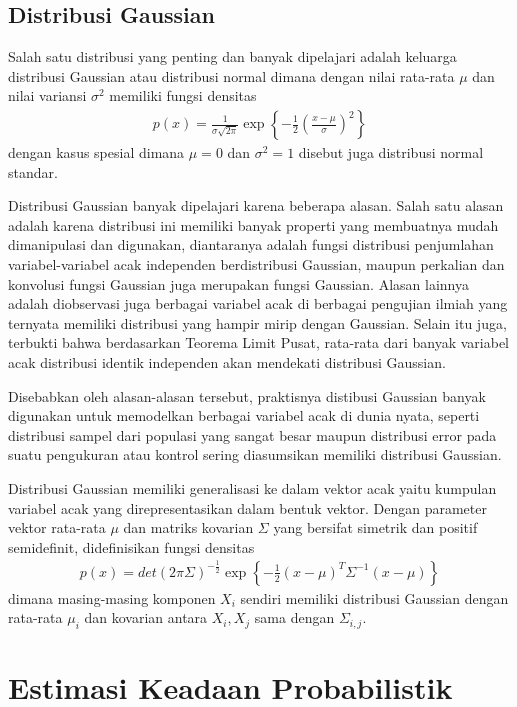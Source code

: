 \subsection{Distribusi Gaussian}

Salah satu distribusi yang penting dan banyak dipelajari adalah keluarga distribusi Gaussian atau distribusi normal dimana dengan nilai rata-rata $\mu$ dan nilai variansi $\sigma^2$ memiliki fungsi densitas
\begin{align}
    p(x) = \frac{1}{\sigma \sqrt{2\pi}} \exp\left\{-\frac{1}{2}\left(\frac{x-\mu}{\sigma}\right)^2\right\}
\end{align}
dengan kasus spesial dimana $\mu = 0$ dan $\sigma^2 = 1$ disebut juga distribusi normal standar.

Distribusi Gaussian banyak dipelajari karena beberapa alasan. Salah satu alasan adalah karena distribusi ini memiliki banyak properti yang membuatnya mudah dimanipulasi dan digunakan, diantaranya adalah fungsi distribusi penjumlahan variabel-variabel acak independen berdistribusi Gaussian, maupun perkalian dan konvolusi fungsi Gaussian juga merupakan fungsi Gaussian. Alasan lainnya adalah diobservasi juga berbagai variabel acak di berbagai pengujian ilmiah yang ternyata memiliki distribusi yang hampir mirip dengan Gaussian. Selain itu juga, terbukti bahwa berdasarkan Teorema Limit Pusat, rata-rata dari banyak variabel acak distribusi identik independen akan mendekati distribusi Gaussian. \citep{degroot2012}

Disebabkan oleh alasan-alasan tersebut, praktisnya distibusi Gaussian banyak digunakan untuk memodelkan berbagai variabel acak di dunia nyata, seperti distribusi sampel dari populasi yang sangat besar maupun distribusi error pada suatu pengukuran atau kontrol sering diasumsikan memiliki distribusi Gaussian.

Distribusi Gaussian memiliki generalisasi ke dalam vektor acak yaitu kumpulan variabel acak yang direpresentasikan dalam bentuk vektor. Dengan parameter vektor rata-rata $\mu$ dan matriks kovarian $\Sigma$ yang bersifat simetrik dan positif semidefinit, didefinisikan fungsi densitas
\begin{align}
    p(x) = det(2 \pi \Sigma)^{-\frac{1}{2}} \exp\left\{-\frac{1}{2}(x-\mu)^T \Sigma^{-1} (x-\mu)\right\}
\end{align}
dimana masing-masing komponen $X_i$ sendiri memiliki distribusi Gaussian dengan rata-rata $\mu_i$ dan kovarian antara $X_i, X_j$ sama dengan $\Sigma_{i,j}$.

\section{Estimasi Keadaan Probabilistik}

